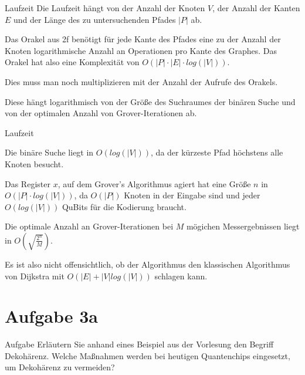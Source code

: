 \documentclass[fleqn,compress,utf8,aspectratio=169,t]{beamer}
\begin{document}
\begin{frame}{Laufzeit}
Die Laufzeit hängt von der Anzahl der Knoten $V$, der Anzahl der Kanten $E$ und der Länge des zu untersuchenden Pfades $|P|$ ab.

Das Orakel aus 2f benötigt für jede Kante des Pfades eine zu der Anzahl der Knoten logarithmische Anzahl an Operationen pro Kante des Graphes. Das Orakel hat also eine Komplexität von $O(|P| \cdot |E| \cdot log(|V|))$.

Dies muss man noch multiplizieren mit der Anzahl der Aufrufe des Orakels.

Diese hängt logarithmisch von der Größe des Suchraumes der binären Suche und von der optimalen Anzahl von Grover-Iterationen ab.
\end{frame}

\begin{frame}{Laufzeit}

Die binäre Suche liegt in $O(log(|V|))$, da der kürzeste Pfad höchstens alle Knoten besucht.

Das Register $x$, auf dem Grover's Algorithmus agiert hat eine Größe $n$ in $O(|P| \cdot log(|V|))$, da $O(|P|)$ Knoten in der Eingabe sind und jeder $O(log(|V|))$ QuBits für die Kodierung braucht.

Die optimale Anzahl an Grover-Iterationen bei $M$ mögichen Messergebnissen liegt in $O(\sqrt{\frac{2^{n}}{M}})$.

Es ist also nicht offensichtlich, ob der Algorithmus den klassischen Algorithmus von Dijkstra mit $O(|E| + |V| log(|V|))$ schlagen kann.
\end{frame}

\section{Aufgabe 3a}

\begin{frame}{Aufgabe}
Erläutern Sie anhand eines Beispiel aus der Vorlesung den Begriff Dekohärenz. Welche Maßnahmen werden bei heutigen Quantenchips eingesetzt, um Dekohärenz zu vermeiden?
\end{frame}
\end{document}
